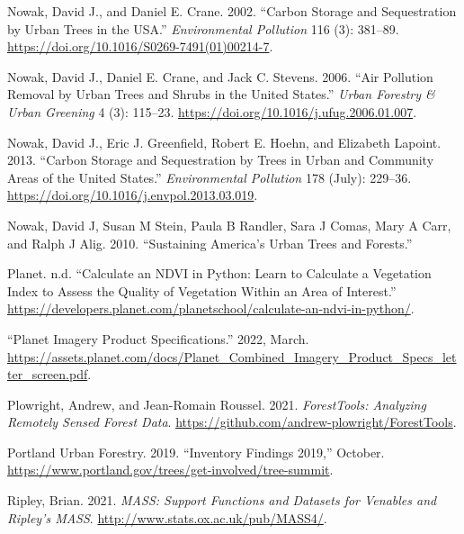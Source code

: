 \documentclass[12pt,twoside]{reedthesis}
\newlength{\cslhangindent}
\newenvironment{CSLReferences}[2] %
 {%
  \setlength{\parindent}{0pt}
  \ifodd #1 \everypar{\setlength{\hangindent}{\cslhangindent}}\ignorespaces\fi
  \ifnum #2 > 0
  \setlength{\parskip}{#2\baselineskip}
  \fi
 }%
 {}
\begin{document}
\begin{CSLReferences}{1}{0}
\leavevmode{}%
Nowak, David J., and Daniel E. Crane. 2002. {``Carbon Storage and Sequestration by Urban Trees in the USA.''} \emph{Environmental Pollution} 116 (3): 381--89. \url{https://doi.org/10.1016/S0269-7491(01)00214-7}.

\leavevmode{}%
Nowak, David J., Daniel E. Crane, and Jack C. Stevens. 2006. {``Air Pollution Removal by Urban Trees and Shrubs in the United States.''} \emph{Urban Forestry \& Urban Greening} 4 (3): 115--23. \url{https://doi.org/10.1016/j.ufug.2006.01.007}.

\leavevmode{}%
Nowak, David J., Eric J. Greenfield, Robert E. Hoehn, and Elizabeth Lapoint. 2013. {``Carbon Storage and Sequestration by Trees in Urban and Community Areas of the United States.''} \emph{Environmental Pollution} 178 (July): 229--36. \url{https://doi.org/10.1016/j.envpol.2013.03.019}.

\leavevmode{}%
Nowak, David J, Susan M Stein, Paula B Randler, Sara J Comas, Mary A Carr, and Ralph J Alig. 2010. {``Sustaining America{'}s Urban Trees and Forests.''}

\leavevmode{}%
Planet. n.d. {``Calculate an NDVI in Python: Learn to Calculate a Vegetation Index to Assess the Quality of Vegetation Within an Area of Interest.''} \url{https://developers.planet.com/planetschool/calculate-an-ndvi-in-python/}.

\leavevmode{}%
{``Planet Imagery Product Specifications.''} 2022, March. \url{https://assets.planet.com/docs/Planet_Combined_Imagery_Product_Specs_letter_screen.pdf}.

\leavevmode{}%
Plowright, Andrew, and Jean-Romain Roussel. 2021. \emph{ForestTools: Analyzing Remotely Sensed Forest Data}. \url{https://github.com/andrew-plowright/ForestTools}.

\leavevmode{}%
Portland Urban Forestry. 2019. {``Inventory Findings 2019,''} October. \url{https://www.portland.gov/trees/get-involved/tree-summit}.

\leavevmode{}%
Ripley, Brian. 2021. \emph{MASS: Support Functions and Datasets for Venables and Ripley's MASS}. \url{http://www.stats.ox.ac.uk/pub/MASS4/}.


\end{CSLReferences}
\end{document}

